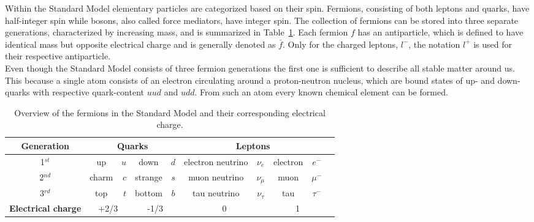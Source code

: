 Within the Standard Model elementary particles are categorized based on their spin. Fermions, consisting of both leptons and quarks, have half-integer spin while bosons, also called force mediators, have integer spin. 
The collection of fermions can be stored into three separate generations, characterized by increasing mass, and is summarized in Table~\ref{table::ElemParticles}.  Each fermion $f$ has an antiparticle, which is defined to have identical mass but opposite electrical charge and is generally denoted as $\bar{f}$. 
Only for the charged leptons, $l^{-}$, the notation $l^{+}$ is used for their respective antiparticle.
\\
Even though the Standard Model consists of three fermion generations the first one is sufficient to describe all stable matter around us.
This because a single atom consists of an electron circulating around a proton-neutron nucleus, which are bound states of up- and down-quarks with respective quark-content $uud$ and $udd$. From such an atom every known chemical element can be formed. 
\setlength\extrarowheight{5pt}
\begin{table}[h!t]
 \centering
 \caption{Overview of the fermions in the Standard Model and their corresponding electrical charge.} \label{table::ElemParticles}
 \begin{tabular}{|c|cr|cc|cc|cc|c|}
  \hline
  \textbf{Generation} 		& \multicolumn{4}{c|}{\textbf{Quarks}} 				& \multicolumn{4}{c|}{\textbf{Leptons}} 				\\
  \hline
  1$^{st}$ 			& up 		& $u$ 		& down 		& $d$ 		& electron neutrino	& $\nu_{e}$ 	& electron	& $e^{-}$ 	\\
  \hline
  2$^{nd}$ 			& charm 	& $c$ 		& strange 	& $s$		& muon neutrino		& $\nu_{\mu}$ 	& muon		& $\mu^{-}$ 	\\
  \hline
  3$^{rd}$ 			& top		& $t$ 		& bottom 	& $b$ 		& tau neutrino 		& $\nu_{\tau}$ 	& tau		& $\tau^{-}$ 	\\
  \hline
  \hline
  \textbf{Electrical charge} 	& \multicolumn{2}{c|}{+2/3} 	& \multicolumn{2}{c|}{-1/3} 	& \multicolumn{2}{c|}{0} 		& \multicolumn{2}{c|}{1}	\\
  \hline
 \end{tabular}
\end{table}

